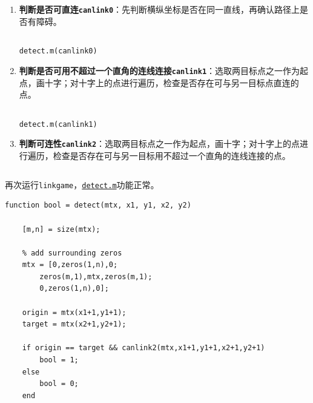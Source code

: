 \documentclass{article}
\numberwithin{figure}{section}
\numberwithin{table}{section}
\numberwithin{listing}{section}
\numberwithin{equation}{section}
\begin{document}
\begin{enumerate}
\begin{enumerate}
                    \item \textbf{判断是否可直连\texttt{canlink0}}：先判断横纵坐标是否在同一直线，再确认路径上是否有障碍。

                        \begin{listing}[H]
                            \inputminted[firstline=61, lastline=72]{matlab}{../linkgame/detect.m}
                            \caption{\texttt{detect.m(canlink0)}}
                        \end{listing}

                    \item \textbf{判断是否可用不超过一个直角的连线连接\texttt{canlink1}}：选取两目标点之一作为起点，画十字；对十字上的点进行遍历，检查是否存在可与另一目标点直连的点。

                        \begin{listing}[H]
                            \inputminted[firstline=75, lastline=96]{matlab}{../linkgame/detect.m}
                            \caption{\texttt{detect.m(canlink1)}}
                        \end{listing}

                    \item \textbf{判断可连性\texttt{canlink2}}：选取两目标点之一作为起点，画十字；对十字上的点进行遍历，检查是否存在可与另一目标用不超过一个直角的连线连接的点。

                        \inputminted[firstline=99, lastline=120]{matlab}{../linkgame/detect.m}
                        \begingroup
                        \endgroup
                \end{enumerate}

                再次运行\texttt{linkgame}，\href{../linkgame/detect.m}{\texttt{detect.m}}功能正常。

                \begin{verbatim}
function bool = detect(mtx, x1, y1, x2, y2)
    
    [m,n] = size(mtx);
    
    % add surrounding zeros
    mtx = [0,zeros(1,n),0;
        zeros(m,1),mtx,zeros(m,1);
        0,zeros(1,n),0];
    
    origin = mtx(x1+1,y1+1);
    target = mtx(x2+1,y2+1);
    
    if origin == target && canlink2(mtx,x1+1,y1+1,x2+1,y2+1)
        bool = 1;
    else
        bool = 0;
    end
       

\end{verbatim}
\end{enumerate}
\end{document}
